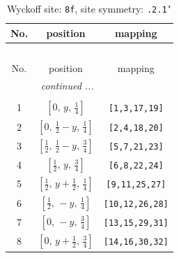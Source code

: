 \documentclass[fleqn,8pt]{jsarticle}
\begin{document}
\begin{longtable}{ccc}
\caption{Wyckoff site: {\tt 8f}, site symmetry: {\tt .2.1'}}
 \\
 \hline \hline
No. & position & mapping \\ \hline \endfirsthead

\multicolumn{2}{l}{\tablename\ \thetable{}} \\
 \hline \hline
No. & position & mapping \\ \hline \endhead

 \hline \hline
\multicolumn{2}{r}{\footnotesize\it continued ...} \\ \endfoot

 \hline \hline
\multicolumn{2}{r}{} \\ \endlastfoot

1 & $\left[ 0,\, y,\, \frac{1}{4} \right]$ & {\tt [1,3,17,19]} \\ \hline
2 & $\left[ 0,\, \frac{1}{2} - y,\, \frac{1}{4} \right]$ & {\tt [2,4,18,20]} \\ \hline
3 & $\left[ \frac{1}{2},\, \frac{1}{2} - y,\, \frac{3}{4} \right]$ & {\tt [5,7,21,23]} \\ \hline
4 & $\left[ \frac{1}{2},\, y,\, \frac{3}{4} \right]$ & {\tt [6,8,22,24]} \\ \hline
5 & $\left[ \frac{1}{2},\, y + \frac{1}{2},\, \frac{1}{4} \right]$ & {\tt [9,11,25,27]} \\ \hline
6 & $\left[ \frac{1}{2},\, - y,\, \frac{1}{4} \right]$ & {\tt [10,12,26,28]} \\ \hline
7 & $\left[ 0,\, - y,\, \frac{3}{4} \right]$ & {\tt [13,15,29,31]} \\ \hline
8 & $\left[ 0,\, y + \frac{1}{2},\, \frac{3}{4} \right]$ & {\tt [14,16,30,32]} \\
\end{longtable}
\renewcommand{\arraystretch}{1.2}
\end{document}
